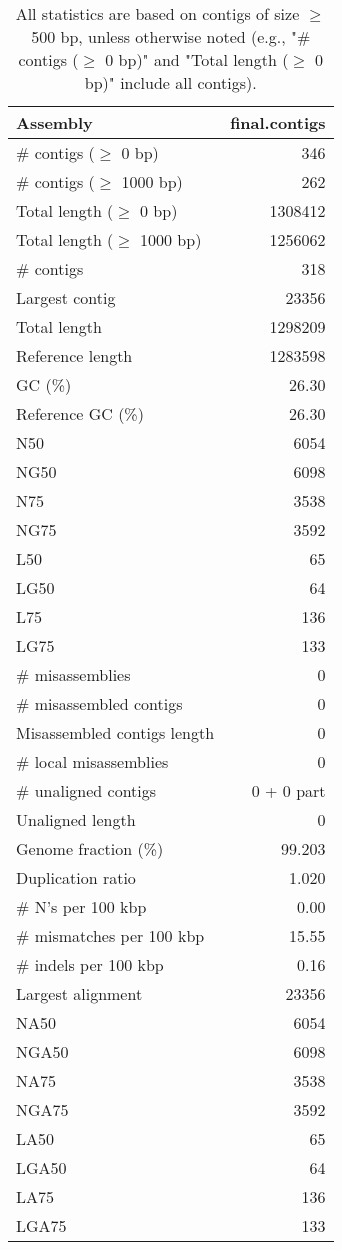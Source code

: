 \documentclass[12pt,a4paper]{article}
\begin{document}
\begin{table}[ht]
\begin{center}
\caption{All statistics are based on contigs of size $\geq$ 500 bp, unless otherwise noted (e.g., "\# contigs ($\geq$ 0 bp)" and "Total length ($\geq$ 0 bp)" include all contigs).}
\begin{tabular}{|l*{1}{|r}|}
\hline
Assembly & final.contigs \\ \hline
\# contigs ($\geq$ 0 bp) & 346 \\ \hline
\# contigs ($\geq$ 1000 bp) & 262 \\ \hline
Total length ($\geq$ 0 bp) & 1308412 \\ \hline
Total length ($\geq$ 1000 bp) & 1256062 \\ \hline
\# contigs & 318 \\ \hline
Largest contig & 23356 \\ \hline
Total length & 1298209 \\ \hline
Reference length & 1283598 \\ \hline
GC (\%) & 26.30 \\ \hline
Reference GC (\%) & 26.30 \\ \hline
N50 & 6054 \\ \hline
NG50 & 6098 \\ \hline
N75 & 3538 \\ \hline
NG75 & 3592 \\ \hline
L50 & 65 \\ \hline
LG50 & 64 \\ \hline
L75 & 136 \\ \hline
LG75 & 133 \\ \hline
\# misassemblies & 0 \\ \hline
\# misassembled contigs & 0 \\ \hline
Misassembled contigs length & 0 \\ \hline
\# local misassemblies & 0 \\ \hline
\# unaligned contigs & 0 + 0 part \\ \hline
Unaligned length & 0 \\ \hline
Genome fraction (\%) & 99.203 \\ \hline
Duplication ratio & 1.020 \\ \hline
\# N's per 100 kbp & 0.00 \\ \hline
\# mismatches per 100 kbp & 15.55 \\ \hline
\# indels per 100 kbp & 0.16 \\ \hline
Largest alignment & 23356 \\ \hline
NA50 & 6054 \\ \hline
NGA50 & 6098 \\ \hline
NA75 & 3538 \\ \hline
NGA75 & 3592 \\ \hline
LA50 & 65 \\ \hline
LGA50 & 64 \\ \hline
LA75 & 136 \\ \hline
LGA75 & 133 \\ \hline
\end{tabular}
\end{center}
\end{table}
\end{document}
